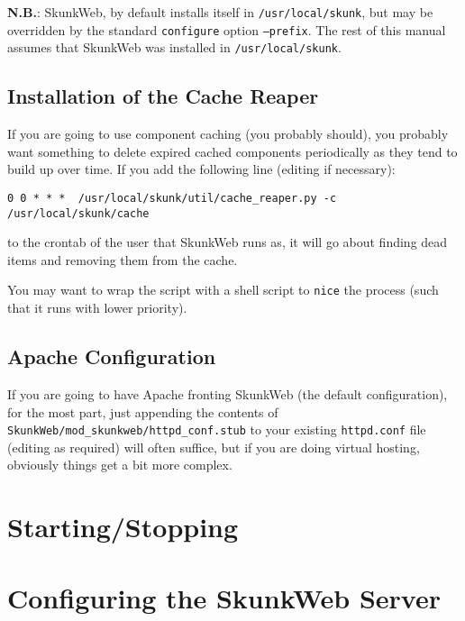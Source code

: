 \documentclass[titlepage]{manual}
\begin{document}
\textbf{N.B.}: SkunkWeb, by default installs itself in
  \texttt{/usr/local/skunk}, but may be overridden by the standard
  \texttt{configure} option \texttt{--prefix}.  The rest of this manual assumes
that SkunkWeb was installed in   \texttt{/usr/local/skunk}.

\section{Installation of the Cache Reaper}
If you are going to use component caching (you probably should), you
probably want something to delete expired cached components
periodically as they tend to build up over time.  If you add the
following line (editing if necessary):
\begin{verbatim}
0 0 * * *  /usr/local/skunk/util/cache_reaper.py -c /usr/local/skunk/cache
\end{verbatim}
to the crontab of the user that
SkunkWeb runs as, it will go about finding dead items and removing
them from the cache.  

You may want to wrap the script with a shell script to \texttt{nice}
the process (such that it runs with lower priority).

\section{Apache Configuration}
If you are going to have Apache fronting SkunkWeb (the default
configuration), for the most part, just appending the contents of
\texttt{SkunkWeb/mod_skunkweb/httpd_conf.stub} to your existing
\texttt{httpd.conf} file (editing as required) will often suffice, but
if you are doing virtual hosting, obviously things get a bit more
complex.

\chapter{Starting/Stopping}

\chapter{Configuring the SkunkWeb Server}
\end{document}
